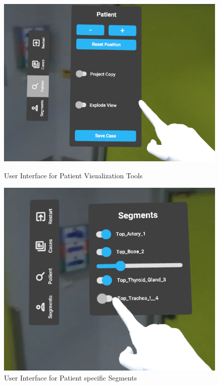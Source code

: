 \begin{figure}[h]
    \centering
    \begin{minipage}{.5\textwidth}
      \centering
      \includegraphics[width=0.95\linewidth]{images/implementation/user_interface/patient.png}
      \caption{\label{fig::UIPatient}User Interface for Patient Visualization Tools}
    \end{minipage}%
    \begin{minipage}{.5\textwidth}
      \centering
      \includegraphics[width=0.95\linewidth]{images/implementation/user_interface/segments.png}
      \caption{\label{fig::UIPatientSegments}User Interface for Patient specific Segments}
    \end{minipage}
  \end{figure}
